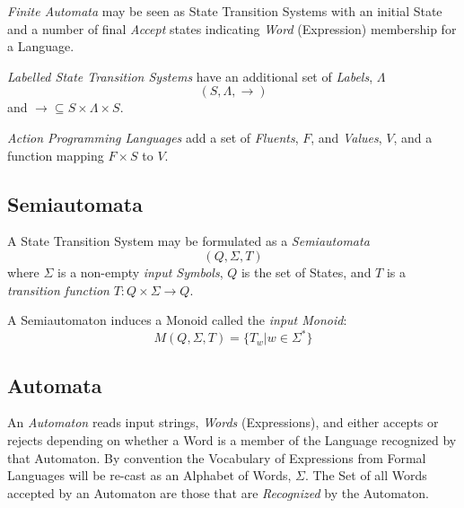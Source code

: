 \emph{Finite Automata} may be seen as State Transition Systems with an
initial State and a number of final \emph{Accept} states indicating
\emph{Word} (Expression) membership for a Language.

\emph{Labelled State Transition Systems} have an additional set of
\emph{Labels}, $\Lambda$
\[(S,\Lambda,\rightarrow)\]
and $\rightarrow \subseteq S \times \Lambda \times S$.

\emph{Action Programming Languages} add a set of \emph{Fluents}, $F$, and
\emph{Values}, $V$, and a function mapping $F \times S$ to $V$.



\subsection{Semiautomata}\label{sec:semiautomata}

A State Transition System may be formulated as a \emph{Semiautomata}
\[
    (Q,\Sigma,T)
\]
where $\Sigma$ is a non-empty \emph{input Symbols}, $Q$ is the set of
States, and $T$ is a \emph{transition function} $T:Q \times \Sigma
\rightarrow Q$.

A Semiautomaton induces a Monoid called the \emph{input Monoid}:
\[
    M(Q,\Sigma,T) = \{T_w | w \in \Sigma^*\}
\]



\subsection{Automata} \label{sec:automata}

An \emph{Automaton} reads input strings, \emph{Words} (Expressions),
and either accepts or rejects depending on whether a Word is a member
of the Language recognized by that Automaton. By convention the
Vocabulary of Expressions from Formal Languages will be re-cast as an
Alphabet of Words, $\Sigma$. The Set of all Words accepted by an
Automaton are those that are \emph{Recognized} by the Automaton.


